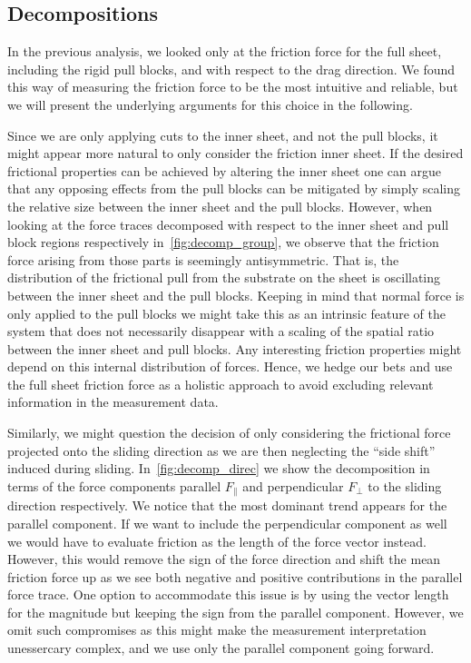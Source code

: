 \subsection{Decompositions}
In the previous analysis, we looked only at the friction force for the full
sheet, including the rigid pull blocks, and with respect to the drag direction. We found this way of measuring the friction force to be the most intuitive and reliable, but we will present the underlying arguments for this choice in the following.

Since we are only applying cuts to the inner sheet, and not the
pull blocks, it might appear more natural to only consider the friction inner sheet. If the desired frictional properties can be achieved by altering the inner
sheet one can argue that any opposing effects from the pull blocks can be
mitigated by simply scaling the relative size between the inner sheet and the pull
blocks. However, when looking at the force traces decomposed with respect to the
inner sheet and pull block regions respectively in~\cref{fig:decomp_group}, we
observe that the friction force arising from those parts is seemingly
antisymmetric. That is, the distribution of the frictional pull from the
substrate on the sheet is oscillating between the inner sheet and the pull
blocks. Keeping in mind that normal force is only applied to the pull blocks we
might take this as an intrinsic feature of the system that does not necessarily disappear with a scaling of the spatial ratio between the inner sheet and pull blocks. Any interesting friction properties might depend on this internal distribution of forces. Hence, we hedge our bets and use the full sheet friction force as a holistic approach to avoid excluding relevant information in the measurement data.

Similarly, we might question the decision of
only considering the frictional force projected onto the sliding direction as
we are then neglecting the ``side shift'' induced during sliding. In~\cref{fig:decomp_direc} we show the decomposition in terms of the force components parallel $F_{\parallel}$ and perpendicular $F_{\perp}$ to the sliding direction respectively. We notice that the most dominant trend appears for the parallel component. If we want to include the perpendicular component as well we would have to evaluate friction as the length of the force vector instead. However, this would remove the sign of the force direction and shift the mean friction force up as we see both negative and positive contributions in the parallel force trace. One option to accommodate this issue is by using the vector length for the magnitude but keeping the sign from the parallel component. However, we omit such compromises as this might make the measurement interpretation unessercary complex, and we use only the parallel component going forward. 

